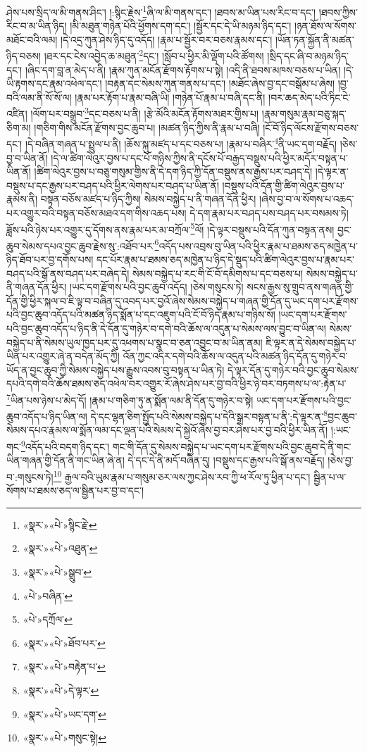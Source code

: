 ཤེས་པས་སྲིད་ལ་མི་གནས་ཤིང་། །:སྙིང་རྗེས་\footnote{«སྣར་»«པེ་»སྙིང་རྗེ་}ཞི་ལ་མི་གནས་དང་། །ཐབས་མ་ཡིན་པས་རིང་བ་དང་། །ཐབས་ཀྱིས་རིང་བ་མ་ཡིན་ཉིད། །མི་མཐུན་གཉེན་པོའི་ཕྱོགས་དག་དང་། །སྦྱོར་དང་དེ་ཡི་མཉམ་ཉིད་དང་། །ཉན་ཐོས་ལ་སོགས་མཐོང་བའི་ལམ། །དེ་འདྲ་ཀུན་ཤེས་ཉིད་དུ་འདོད། །རྣམ་པ་སྦྱོར་བར་བཅས་རྣམས་དང་། །ཡོན་ཏན་སྐྱོན་ནི་མཚན་ཉིད་བཅས། །ཐར་དང་ངེས་འབྱེད་ཆ་མཐུན་\footnote{«སྣར་»«པེ་»འཐུན་}དང་། །སློབ་པ་ཕྱིར་མི་ལྡོག་པའི་ཚོགས། །སྲིད་དང་ཞི་བ་མཉམ་ཉིད་དང་། །ཞིང་དག་བླ་ན་མེད་པ་ནི། །རྣམ་ཀུན་མངོན་རྫོགས་རྟོགས་པ་སྟེ། །འདི་ནི་ཐབས་མཁས་བཅས་པ་ཡིན། །དེ་ཡི་རྟགས་དང་རྣམ་འཕེལ་དང་། །བརྟན་དང་སེམས་ཀུན་གནས་པ་དང་། །མཐོང་ཞེས་བྱ་དང་བསྒོམ་པ་ཞེས། །བྱ་བའི་ལམ་ནི་སོ་སོ་ལ། །རྣམ་པར་རྟོག་པ་རྣམ་བཞི་ཡི། །གཉེན་པོ་རྣམ་པ་བཞི་དང་ནི། །བར་ཆད་མེད་པའི་ཏིང་ངེ་འཛིན། །ལོག་པར་བསྒྲུབ་\footnote{«སྣར་»«པེ་»སྒྲུབ་}དང་བཅས་པ་ནི། །རྩེ་མོའི་མངོན་རྟོགས་མཐར་གྱིས་པ། །རྣམ་གསུམ་རྣམ་བཅུ་སྐད་ཅིག་མ། །གཅིག་གིས་མངོན་རྫོགས་བྱང་ཆུབ་པ། །མཚན་ཉིད་ཀྱིས་ནི་རྣམ་པ་བཞི། །ངོ་བོ་ཉིད་ལོངས་རྫོགས་བཅས་དང་། །དེ་བཞིན་གཞན་པ་སྤྲུལ་པ་ནི། །ཆོས་སྐུ་མཛད་པ་དང་བཅས་པ། །རྣམ་པ་བཞིར་\footnote{«པེ་»བཞིན་}ནི་ཡང་དག་བརྗོད། །ཅེས་བྱ་བ་ཡིན་ནོ། །དེ་ལ་ཚིག་ལེའུར་བྱས་པ་དང་པོ་གཉིས་ཀྱིས་ནི་དངོས་པོ་བརྒྱད་བསྡུས་པའི་ཕྱིར་མདོར་བསྟན་པ་ཡིན་ནོ། །ཚིག་ལེའུར་བྱས་པ་བཅུ་གསུམ་གྱིས་ནི་དེ་དག་ཉིད་ཀྱི་དོན་བསྡུས་ནས་རྒྱས་པར་བཤད་དེ། །དེ་ལྟར་ན་བསྡུས་པ་དང་རྒྱས་པར་བཤད་པའི་ཕྱིར་ལེགས་པར་བཤད་པ་ཡིན་ནོ། །བསྡུས་པའི་དོན་གྱི་ཚིག་ལེའུར་བྱས་པ་རྣམས་ནི། བསྟན་བཅོས་མཛད་པ་ཉིད་ཀྱིས། སེམས་བསྐྱེད་པ་ནི་གཞན་དོན་ཕྱིར། །ཞེས་བྱ་བ་ལ་སོགས་པ་འཆད་པར་འགྱུར་བའི་བསྟན་བཅོས་མཐའ་དག་གིས་འཆད་པས། དེ་དག་རྣམ་པར་བཤད་པས་བཤད་པར་བསམས་ཏེ། ཟློས་པའི་ཉེས་པར་འགྱུར་དུ་དོགས་ནས་རྣམ་པར་མ་བཀྲོལ་\footnote{«པེ་»དཀྲོལ་}ལོ། །དེ་ལྟར་བསྡུས་པའི་དོན་ཀུན་བསྟན་ནས། བྱང་ཆུབ་སེམས་དཔའ་བྱང་ཆུབ་རྗེས་སུ་:འཐོབ་པར་\footnote{«སྣར་»«པེ་»ཐོབ་པར་}འདོད་པས་འབྲས་བུ་ཡིན་པའི་ཕྱིར་རྣམ་པ་ཐམས་ཅད་མཁྱེན་པ་ཉིད་ཐོབ་པར་བྱ་དགོས་པས། དང་པོར་རྣམ་པ་ཐམས་ཅད་མཁྱེན་པ་ཉིད་དེ་སྡུད་པའི་ཚིག་ལེའུར་བྱས་པ་རྣམ་པར་བཤད་པའི་སྒོ་ནས་བཤད་པར་བཞེད་དེ། སེམས་བསྐྱེད་པ་རང་གི་ངོ་བོ་དམིགས་པ་དང་བཅས་པ། སེམས་བསྐྱེད་པ་ནི་གཞན་དོན་ཕྱིར། །ཡང་དག་རྫོགས་པའི་བྱང་ཆུབ་འདོད། །ཅེས་གསུངས་ཏེ། སངས་རྒྱས་སུ་གྲུབ་ནས་གཞན་གྱི་དོན་གྱི་ཕྱིར་སྐལ་བ་ཇི་ལྟ་བ་བཞིན་དུ་འབད་པར་བྱའོ་ཞེས་སེམས་བསྐྱེད་པ་གཞན་གྱི་དོན་དུ་ཡང་དག་པར་རྫོགས་པའི་བྱང་ཆུབ་འདོད་པའི་མཚན་ཉིད་སྨོན་པ་དང་འཇུག་པའི་ངོ་བོ་ཉིད་རྣམ་པ་གཉིས་སོ། །ཡང་དག་པར་རྫོགས་པའི་བྱང་ཆུབ་འདོད་པ་ཉིད་ནི་དེ་དོན་དུ་གཉེར་བ་དགེ་བའི་ཆོས་ལ་འདུན་པ་སེམས་ལས་བྱུང་བ་ཡིན་ལ། སེམས་བསྐྱེད་པ་ནི་སེམས་ཡུལ་ཁྱད་པར་དུ་འཕགས་པ་སྣང་བ་ཅན་འབྱུང་བ་མ་ཡིན་ནམ། ཇི་ལྟར་ན་དེ་སེམས་བསྐྱེད་པ་ཡིན་པར་འགྱུར་ཞེ་ན་བདེན་མོད་ཀྱི། འོན་ཀྱང་འདིར་དགེ་བའི་ཆོས་ལ་འདུན་པའི་མཚན་ཉིད་དོན་དུ་གཉེར་བ་ཡོད་ན་བྱང་ཆུབ་ཀྱི་སེམས་བསྐྱེད་པས་རྒྱུས་འབས་བུ་བསྟན་པ་ཡིན་ཏེ། དེ་ལྟར་དོན་དུ་གཉེར་བའི་བྱང་ཆུབ་སེམས་དཔའི་དགེ་བའི་ཆོས་ཐམས་ཅད་འཕེལ་བར་འགྱུར་རོ་ཞེས་ཤེས་པར་བྱ་བའི་ཕྱིར་ཉེ་བར་བཏགས་པ་ལ་:རྟེན་པ་\footnote{«སྣར་»«པེ་»བརྟེན་པ་}ཡིན་པས་ཉེས་པ་མེད་དོ། །རྣམ་པ་གཅིག་ཏུ་ན་སྨོན་ལམ་ནི་དོན་དུ་གཉེར་བ་སྟེ། ཡང་དག་པར་རྫོགས་པའི་བྱང་ཆུབ་འདོད་པ་ཉིད་ཡིན་ལ། དེ་དང་ལྷན་ཅིག་སྤྱོད་པའི་སེམས་བསྐྱེད་པ་དེའི་སྒྲར་བསྟན་པ་ནི་:དེ་ལྟར་ན་\footnote{«སྣར་»«པེ་»དེ་ལྟར་}བྱང་ཆུབ་སེམས་དཔའ་རྣམས་ལ་སྨོན་ལམ་དང་ལྡན་པའི་སེམས་དེ་སྐྱེའོ་ཞེས་བྱ་བར་ཤེས་པར་བྱ་བའི་ཕྱིར་ཡིན་ནོ། །:ཡང་གང་\footnote{«སྣར་»«པེ་»ཡང་དག་}འདོད་པའི་བདག་ཉིད་དང་། གང་གི་དོན་དུ་སེམས་བསྐྱེད་པ་ཡང་དག་པར་རྫོགས་པའི་བྱང་ཆུབ་དེ་ནི་གང་ཡིན་གཞན་གྱི་དོན་ནི་གང་ཡིན་ཞེ་ན། དེ་དང་དེ་ནི་མདོ་བཞིན་དུ། །བསྡུས་དང་རྒྱས་པའི་སྒོ་ནས་བརྗོད། །ཅེས་བྱ་བ་:གསུངས་ཏེ།\footnote{«སྣར་»«པེ་»གསུང་སྟེ།} རྒྱལ་བའི་ཡུམ་རྣམ་པ་གསུམ་ཅར་ལས་ཀྱང་ཤེས་རབ་ཀྱི་ཕ་རོལ་ཏུ་ཕྱིན་པ་དང་། སྦྱིན་པ་ལ་སོགས་པ་ཐམས་ཅད་ལ་སྦྱིན་པར་བྱ་བ་དང་། 